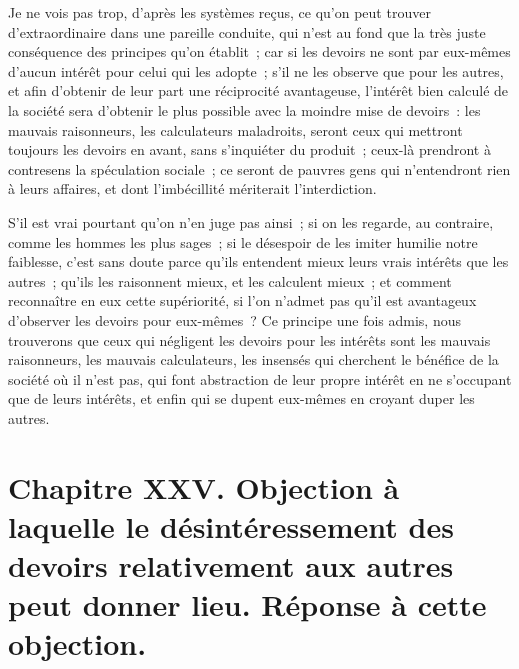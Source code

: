 \documentclass[french,twoside]{book} %
\newcommand\chapteropen{} %
\newcommand\chapterclose{} %
\begin{document}
Je ne vois pas trop, d’après les systèmes reçus, ce qu’on peut trouver d’extraordinaire dans une pareille conduite, qui n’est au fond que la très juste conséquence des principes qu’on établit ; car si les devoirs ne sont par eux-mêmes d’aucun intérêt pour celui qui les adopte ; s’il ne les observe que pour les autres, et afin d’obtenir de leur part une réciprocité avantageuse, l’intérêt bien calculé de la société sera d’obtenir le plus possible avec la moindre mise de devoirs : les mauvais raisonneurs, les calculateurs maladroits, seront ceux qui mettront toujours les devoirs en avant, sans s’inquiéter du produit ; ceux-là prendront à contresens la spéculation sociale ; ce seront de pauvres gens qui n’entendront rien à leurs affaires, et dont l’imbécillité mériterait l’interdiction.\par
S’il est vrai pourtant qu’on n’en juge pas ainsi ; si on les regarde, au contraire, comme les hommes les plus sages ; si le désespoir de les imiter humilie notre faiblesse, c’est sans doute parce qu’ils entendent mieux leurs vrais intérêts que les autres ; qu’ils les raisonnent mieux, et les calculent mieux ; et comment reconnaître en eux cette supériorité, si l’on n’admet pas qu’il est avantageux d’observer les devoirs pour eux-mêmes ? Ce principe une fois admis, nous trouverons que ceux qui négligent les devoirs pour les intérêts sont les mauvais raisonneurs, les mauvais calculateurs, les insensés qui cherchent le bénéfice de la société où il n’est pas, qui font abstraction de leur propre intérêt en ne s’occupant que de leurs intérêts, et enfin qui se dupent eux-mêmes en croyant duper les autres.
\chapterclose


\chapteropen
\chapter[{Chapitre XXV. Objection à laquelle le désintéressement des devoirs relativement aux autres peut donner lieu. Réponse à cette objection.}]{Chapitre XXV. Objection à laquelle le désintéressement des devoirs relativement aux autres peut donner lieu. Réponse à cette objection.}\renewcommand{\leftmark}{Chapitre XXV. Objection à laquelle le désintéressement des devoirs relativement aux autres peut donner lieu. Réponse à cette objection.}
\end{document}

